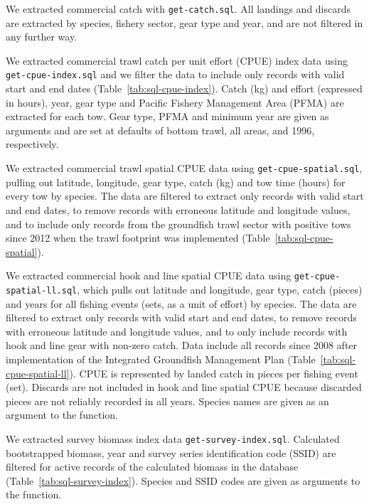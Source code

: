 \documentclass[11pt]{book}\usepackage[]{graphicx}\usepackage[]{color}
\begin{document}
We extracted commercial catch with \texttt{get-catch.sql}. All landings and
discards are extracted by species, fishery sector, gear type and year, and are
not filtered in any further way.

We extracted commercial trawl catch per unit effort (CPUE) index data using
\texttt{get-cpue-index.sql} and we filter the data to include only records with
valid start and end dates (Table~\ref{tab:sql-cpue-index}). Catch (kg) and
effort (expressed in hours), year, gear type and Pacific Fishery Management Area
(PFMA) are extracted for each tow. Gear type, PFMA and minimum year are given as
arguments and are set at defaults of bottom trawl, all areas, and 1996,
respectively.

We extracted commercial trawl spatial CPUE data using
\texttt{get-cpue-spatial.sql}, pulling out latitude, longitude, gear type, catch
(kg) and tow time (hours) for every tow by species. The data are filtered to
extract only records with valid start and end dates, to remove records with
erroneous latitude and longitude values, and to include only records from the
groundfish trawl sector with positive tows since 2012 when the trawl footprint
was implemented (Table~\ref{tab:sql-cpue-spatial}).

We extracted commercial hook and line spatial CPUE data using
\texttt{get-cpue-spatial-ll.sql}, which pulls out latitude and longitude, gear
type, catch (pieces) and years for all fishing events (sets, as a unit of
effort) by species. The data are filtered to extract only records with valid
start and end dates, to remove records with erroneous latitude and longitude
values, and to only include records with hook and line gear with non-zero catch.
Data include all records since 2008 after implementation of the Integrated
Groundfish Management Plan (Table~\ref{tab:sql-cpue-spatial-ll}). CPUE is
represented by landed catch in pieces per fishing event (set). Discards are not
included in hook and line spatial CPUE because discarded pieces are not reliably
recorded in all years. Species names are given as an argument to the function.

We extracted survey biomass index data \texttt{get-survey-index.sql}. Calculated
bootstrapped biomass, year and survey series identification code (SSID) are
filtered for active records of the calculated biomass in the database
(Table~\ref{tab:sql-survey-index}). Species and SSID codes are given as
arguments to the function.
\end{document}
